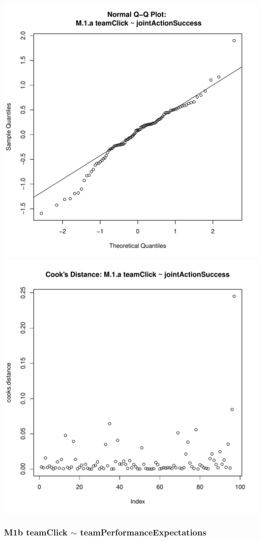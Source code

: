 \documentclass[12pt]{report}
\begin{document}
\includegraphics[scale =.4]{../images/MLM1aQQPlot.pdf}
\includegraphics[scale =.4]{../images/MLM1aCooksD.pdf}

\newpage
\subsubsection{M1b teamClick $\sim$ teamPerformanceExpectations}

\end{document}
